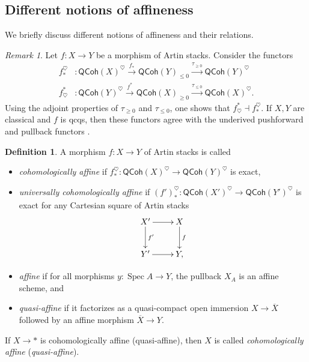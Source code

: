 \documentclass[a4paper,twoside,11pt]{amsart}
\theoremstyle{plain}
\theoremstyle{definition}
\newtheorem{definition}[theorem]{Definition}
\theoremstyle{remark}
\newtheorem{remark}[theorem]{Remark}
\numberwithin{equation}{section}
\DeclareMathOperator{\Spec}{Spec} %
\newcommand{\QCoh}{\mathsf{QCoh}}
\begin{document}
\subsection{Different notions of affineness} We briefly discuss different notions of affineness and their relations.
\begin{remark}
    Let $f \colon X \to Y$ be a morphism of Artin stacks. Consider the functors
    \begin{align*}
        f_*^{\heartsuit} &\colon \QCoh(X)^{\heartsuit} \xrightarrow{f_*} \QCoh(Y)_{\leq 0} \xrightarrow{\tau_{\geq 0}} \QCoh(Y)^{\heartsuit} \\
        f^*_\heartsuit & \colon \QCoh(Y)^{\heartsuit} \xrightarrow{f^*} \QCoh(X)_{\geq 0} \xrightarrow{\tau_{\leq 0}} \QCoh(X)^{\heartsuit}.
    \end{align*}
    Using the adjoint properties of $\tau_{\geq 0}$ and $\tau_{\leq 0}$, one shows that $f^*_\heartsuit \dashv f_*^{\heartsuit}$. If $X,Y$ are classical and $f$ is qcqs, then these functors agree with the underived pushforward and pullback functors \cite[Lem.~1.2]{HallRydhPerfect}.
\end{remark}

\begin{definition}
    A morphism $f \colon X \to Y$ of Artin stacks is called
    \begin{itemize}
        \item \textit{cohomologically affine} if $f_*^{\heartsuit} \colon \QCoh(X)^\heartsuit \to \QCoh(Y)^\heartsuit$ is exact,
        \item \textit{universally cohomologically affine} if $(f')_*^{\heartsuit} \colon \QCoh(X')^\heartsuit \to \QCoh(Y')^\heartsuit$ is exact for any Cartesian square of Artin stacks
        \begin{align*}
            \xymatrix{
            X' \ar[d]^-{f'} \ar[r] & X \ar[d]^-{f} \\
            Y' \ar[r] & Y,
            }
        \end{align*}
        \item \textit{affine} if for all morphisms $y \colon \Spec A \to Y$, the pullback $X_A$ is an affine scheme, and
        \item \emph{quasi-affine} if it factorizes as a quasi-compact open immersion $X \to \overline{X}$ followed by an affine morphism $\overline{X} \to Y$. 
    \end{itemize}
    If $X \to *$ is cohomologically affine (quasi-affine), then $X$ is called \emph{cohomologically affine} (\emph{quasi-affine}).
\end{definition}
\end{document}
